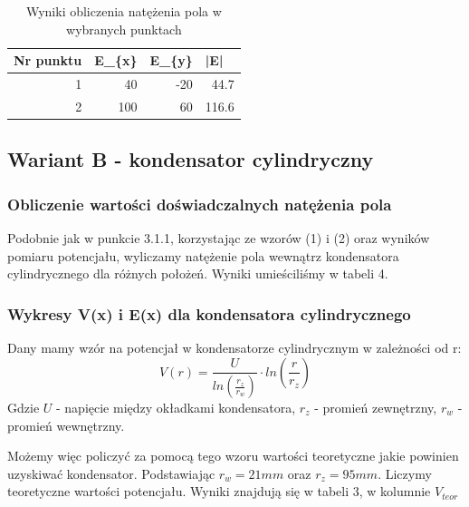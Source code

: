 \documentclass{article}
\begin{document}
\begin{table}[h!tbp]
\centering
\begin{tabular}{|r|r|r|r|}
\hline
\multicolumn{1}{|l|}{Nr punktu} & \multicolumn{1}{l|}{E\_\{x\}} & \multicolumn{1}{l|}{E\_\{y\}} & \multicolumn{1}{l|}{|E|} \\ \hline
1 & 40 & -20 & 44.7 \\ \hline
2 & 100 & 60 & 116.6 \\ \hline
\end{tabular}
\label{}
\caption{Wyniki obliczenia natężenia pola w wybranych punktach}
\end{table}


\subsection{Wariant B - kondensator cylindryczny}
\subsubsection{Obliczenie wartości doświadczalnych natężenia pola}
Podobnie jak w punkcie 3.1.1, korzystając ze wzorów (1) i (2) oraz wyników pomiaru potencjału, wyliczamy natężenie pola wewnątrz kondensatora cylindrycznego dla różnych położeń. \newline Wyniki umieściliśmy w tabeli 4.
\subsubsection{Wykresy V(x) i E(x) dla kondensatora cylindrycznego}
Dany mamy wzór na potencjał w kondensatorze cylindrycznym w zależności od r:
\begin{equation}
	V(r) = \frac{U}{ln(\frac{r_{z}}{r_{w}})} \cdot ln(\frac{r}{r_{z}})
\end{equation}
Gdzie $U$ - napięcie między okładkami kondensatora, $r_{z}$ - promień zewnętrzny, $r_{w}$ - promień wewnętrzny.

Możemy więc policzyć za pomocą tego wzoru wartości teoretyczne jakie powinien uzyskiwać kondensator.
Podstawiając $r_{w} = 21 mm$ oraz $r_{z} = 95 mm$. Liczymy teoretyczne wartości potencjału. Wyniki znajdują się w tabeli 3, w kolumnie $V_{teor}$
\end{document}
